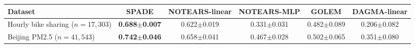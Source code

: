 \begin{tabular}{lccccc}
\toprule
Dataset & SPADE & NOTEARS-linear & NOTEARS-MLP & GOLEM & DAGMA-linear \\ \midrule
Hourly bike sharing ($n{=}17{,}303$) & \textbf{0.688$\pm$0.007} & 0.622$\pm$0.019 & 0.331$\pm$0.031 & 0.482$\pm$0.089 & 0.206$\pm$0.082 \\
Beijing PM2.5 ($n{=}41{,}543$) & \textbf{0.742$\pm$0.046} & 0.658$\pm$0.041 & 0.467$\pm$0.028 & 0.502$\pm$0.065 & 0.351$\pm$0.080 \\
\bottomrule
\end{tabular}

